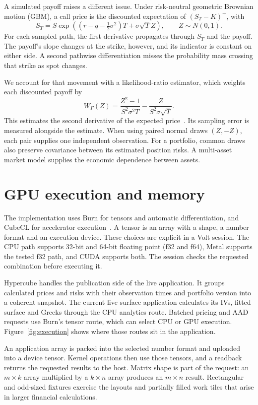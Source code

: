 \documentclass[8pt]{strategynet-journal}
\begin{document}
\begin{SNcolumns}
A simulated payoff raises a different issue. Under risk-neutral geometric Brownian motion
(GBM), a call price is the discounted expectation of $(S_T-K)^+$, with
\[
 S_T=S\exp\!\left((r-q-\tfrac12\sigma^2)T+\sigma\sqrt T Z\right),
 \qquad Z\sim N(0,1).
\]
For each sampled path, the first derivative propagates through $S_T$ and the
payoff. The payoff's slope changes at the strike, however, and its indicator
is constant on either side. A second pathwise differentiation misses the
probability mass crossing that strike as spot changes.

We account for that movement with a likelihood-ratio estimator, which
weights each discounted payoff by
\begin{equation}
 W_\Gamma(Z)=\frac{Z^2-1}{S^2\sigma^2T}
             -\frac{Z}{S^2\sigma\sqrt T}.\label{eq:lrgamma}
\end{equation}
This estimates the second derivative of the expected price~\cite{broadie}.
Its sampling error is measured alongside the estimate. When using paired
normal draws $(Z,-Z)$, each pair supplies one independent observation.
For a portfolio, common draws also preserve covariance between its estimated
position risks. A multi-asset market model supplies the economic dependence
between assets.

\section{GPU execution and memory}
The implementation uses Burn for tensors and automatic differentiation, and
CubeCL for accelerator execution~\cite{burn,cubecl}. A tensor is an array with
a shape, a number format and an execution device. These choices are explicit
in a Volt session. The CPU path supports 32-bit and 64-bit floating point
(f32 and f64), Metal supports the tested f32 path, and CUDA supports both.
The session checks the requested combination before executing it.

Hypercube handles the publication side of the live application. It groups
calculated prices and risks with their observation times and portfolio version
into a coherent snapshot. The current live surface application calculates its
IVs, fitted surface and Greeks through the CPU analytics route. Batched pricing
and AAD requests use Burn's tensor route, which can select CPU or GPU execution.
Figure~\ref{fig:execution} shows where those routes sit in the application.



An application array is packed into the selected number format and uploaded
into a device tensor. Kernel operations then use those tensors, and a readback
returns the requested results to the host. Matrix shape is part of the request:
an $m\times k$ array multiplied by a $k\times n$ array produces an
$m\times n$ result. Rectangular and odd-sized fixtures exercise the layouts
and partially filled work tiles that arise in larger financial calculations.


\end{SNcolumns}
\end{document}

